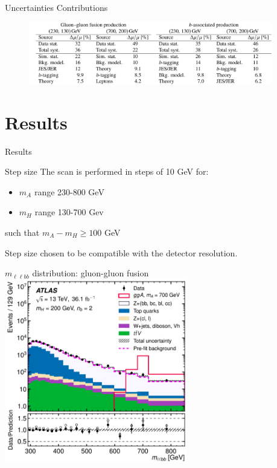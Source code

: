 \documentclass[10pt]{beamer} %
\begin{document}
\begin{frame}{Uncertainties Contributions}

    \begin{figure}
        \centering
        \includegraphics[width=0.95\textwidth]{Figs/uncertainties_table.jpg}
    \end{figure}
    
\end{frame}


\section{Results}

\begin{frame}{Results}

    \begin{block}{Step size}
    The scan is performed in steps of 10 GeV for:

    \begin{itemize}
        \item $m_A$ range 230-800 GeV
        \item $m_H$ range 130-700 Gev
    \end{itemize}
    such that $m_A - m_H \geq 100$ GeV
    \end{block}

    Step size chosen to be compatible with the detector resolution.
\end{frame}



\begin{frame}{$m_{\ell\ell b b}$ distribution: gluon-gluon fusion}
        \centering
        \includegraphics[width=0.6\textwidth]{Figs/mllbb_distribution.png}
        \caption{}
        \label{fig:mllbb-distribution} 
\end{frame}
\end{document}
